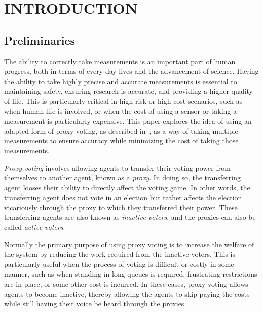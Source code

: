 %
%

\chapter{INTRODUCTION}\label{ch:introduction}
\thispagestyle{empty}

\section{Preliminaries}\label{sec:preliminaries}
The ability to correctly take measurements is an important part of human
progress, both in terms of every day lives and the advancement of science.
Having the ability to take highly precise and accurate measurements is essential
to maintaining safety, ensuring research is accurate, and providing a higher
quality of life.
This is particularly critical in high-risk or high-cost scenarios, such as when
human life is involved, or when the cost of using a sensor or taking a
measurement is particularly expensive.  %
This paper explores the idea of using an adapted form of proxy voting, as
described in~\cite{Cohensius2017}, as a way of taking multiple measurements to
ensure accuracy while minimizing the cost of taking those measurements.

\textit{Proxy voting} involves allowing agents to transfer their voting power
from themselves to another agent, known as a \textit{proxy}\cite[para. 1.4]
{Cohensius2017}.
In doing so, the transferring agent looses their ability to directly affect the
voting game.
In other words, the transferring agent does not vote in an election but rather
affects the election vicariously through the proxy to which they transferred
their power.
These transferring agents are also known as \textit{inactive voters}, and the
proxies can also be called \textit{active voters}.

Normally the primary purpose of using proxy voting is to increase the welfare
of the system by reducing the work required from the inactive voters.
This is particularly useful when the process of voting is difficult or costly
in some manner, such as when standing in long queues is required, frustrating
restrictions are in place, or some other cost is incurred.
In these cases, proxy voting allows agents to become inactive, thereby allowing
the agents to skip paying the costs while still having their voice be heard
through the proxies.

